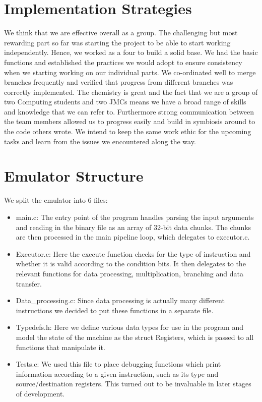 \documentclass[10pt]{article}
\begin{document}
\section*{Implementation Strategies}
\hspace*{0.6cm} We think that we are effective overall as a group. The challenging but most rewarding part so far was starting the project to be able to start working independently. Hence, we worked as a four to build a solid base. We had the basic functions and established the practices we would adopt to ensure consistency when we starting working on our individual parts. We co-ordinated well to merge branches frequently and verified that progress from different branches was correctly implemented. The chemistry is great and the fact that we are a group of two Computing students and two JMCs means we have a broad range of skills and knowledge that we can refer to. Furthermore strong communication between the team members allowed us to progress easily and build in symbiosis around to the code others wrote. We intend to keep the same work ethic for the upcoming tasks and learn from the issues we encountered along the way. 
\section*{Emulator Structure}
We split the emulator into 6 files:
\begin{itemize}
\item main.c: The entry point of the program handles parsing the input arguments and reading in the binary file as an array of 32-bit data chunks. The chunks are then processed in the main pipeline loop, which delegates to executor.c.
\item Executor.c: Here the execute function checks for the type of instruction and whether it is valid according to the condition bits. It then delegates to the relevant functions for data processing, multiplication, branching and data transfer.
\item Data\_processing.c: Since data processing is actually many different instructions we decided to put these functions in a separate file.
\item Typedefs.h: Here we define various data types for use in the program and model the state of the machine as the struct Registers, which is passed to all functions that manipulate it.
\item Tests.c: We used this file to place debugging functions which print information according to a given instruction, such as its type and source/destination registers. This turned out to be invaluable in later stages of development.
\end{itemize}
\end{document}
